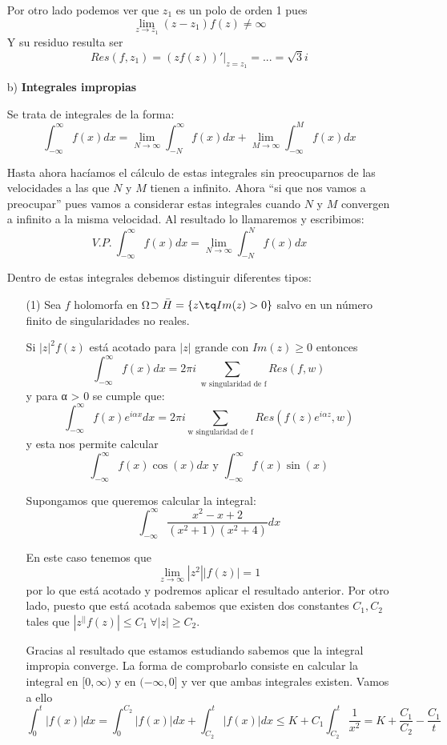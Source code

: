 \documentclass{apuntes}
\begin{document}
\begin{enumerate}
\begin{example}
Por otro lado podemos ver que $z_1$ es un polo de orden 1 pues
\[\lim_{z \to z_1} (z-z_1)f(z) \neq \infty\]
Y su residuo resulta ser
\[Res(f,z_1)=\left. \left(zf(z)\right)'\right|_{z=z_1} = ... = \sqrt{3}i\]
\end{example}

\item[b)] \textbf{Integrales impropias}

Se trata de integrales de la forma:
\[\int_{-\infty}^{\infty} f(x)dx = \lim_{N \to \infty}\int_{-N}^{\infty}f(x)dx + \lim_{M \to \infty} \int_{-\infty}^{M} f(x)dx\]

Hasta ahora hacíamos el cálculo de estas integrales sin preocuparnos de las velocidades a las que $N$ y $M$ tienen a infinito. Ahora ``si que nos vamos a preocupar'' pues vamos a considerar estas integrales cuando $N$ y $M$ convergen a infinito a la misma velocidad. Al resultado lo llamaremos  y escribimos:
\[V.P. \ \int_{-\infty}^{\infty} f(x)dx = \lim_{N \to \infty}\int_{-N}^N f(x)dx\]

Dentro de estas integrales debemos distinguir diferentes tipos:
\begin{enumerate}
\item[(1)] Sea $f$ holomorfa en Ω$\supset \bar{H}=\{z \tq Im(z)>0\}$ salvo en un número finito de singularidades no reales.

Si $|z|^2f(z)$ está acotado para $|z|$ grande con $Im(z)\geq 0$ entonces
\[\int_{-\infty}^{\infty}f(x)dx = 2πi \sum_{\text{ w singularidad de f}}Res(f,w)\]
y para α > 0 se cumple que:
\[\int_{-\infty}^{\infty} f(x)e^{iαx}dx = 2πi \sum_{\text{w singularidad de f}}Res(f(z)e^{iαz},w)\]
y esta nos permite calcular
\[\int_{-\infty}^{\infty} f(x)\cos(x)dx \text{ y } \int_{-\infty}^{\infty}f(x)\sin(x)\]

\begin{example}
Supongamos que queremos calcular la integral:
\[\int_{-\infty}^{\infty} \frac{x^2-x+2}{(x^2+1)(x^2+4)}dx\]

En este caso tenemos que
\[\lim_{z \to \infty} |z^2||f(z)|=1\]
por lo que está acotado y podremos aplicar el resultado anterior. Por otro lado, puesto que está acotada sabemos que existen dos constantes $C_1, C_2$ tales que $|z^||f(z)|\leq C_1 \ \forall |z|  \geq C_2$.

Gracias al resultado que estamos estudiando sabemos que la integral impropia converge. La forma de comprobarlo consiste en calcular la integral en $[0,\infty)$ y en $(-\infty, 0]$ y ver que ambas integrales existen. Vamos a ello
\[\int_0^t |f(x)|dx = \int_0^{C_2}|f(x)|dx + \int_{C_2}^t |f(x)|dx \leq K+C_1\int_{C_2}^t \frac{1}{x^2}=K+\frac{C_1}{C_2}-\frac{C_1}{t}\]


\end{example}
\end{enumerate}
\end{enumerate}
\end{document}
